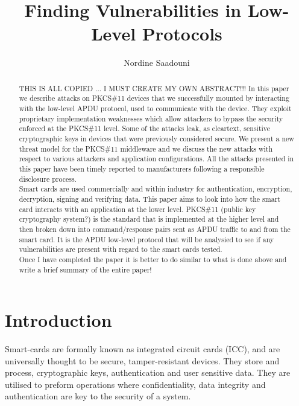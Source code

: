 \documentclass[a4paper]{report}
\begin{document}
\title{Finding Vulnerabilities in Low-Level Protocols}
\date{}
\author{Nordine Saadouni}
\maketitle
\newpage



\begin{abstract}

THIS IS ALL COPIED ... I MUST CREATE MY OWN ABSTRACT!!!
\noindent In this paper we describe attacks on PKCS\#11 devices that we successfully mounted by interacting with
the low-level APDU protocol, used to communicate with the device. They exploit proprietary implementation
weaknesses which allow attackers to bypass the security enforced at the PKCS\#11 level. Some of the attacks
leak, as cleartext, sensitive cryptographic keys in devices that were previously considered secure. We
present a new threat model for the PKCS\#11 middleware and we discuss the new attacks with respect to
various attackers and application configurations. All the attacks presented in this paper have been timely
reported to manufacturers following a responsible disclosure process.\\


Smart cards are used commercially and within industry for authentication, encryption, decryption, signing and verifying data. This paper aims to look into how the smart card interacts with an application at the lower level. PKCS\#11 (public key cryptography system?) is the standard that is implemented at the higher level and then broken down into command/response pairs sent as APDU traffic to and from the smart card. It is the APDU low-level protocol that will be analysied to see if any vulnerabilities are present with regard to the smart cards tested.\\


Once I have completed the paper it is better to do similar to what is done above and write a brief summary of the entire paper!


\end{abstract}
\newpage


\tableofcontents
\newpage


\chapter{Introduction}
Smart-cards are formally known as integrated circuit cards (ICC), and are universally thought to be secure, tamper-resistant devices. They store and process, cryptographic keys, authentication and user sensitive data. They are utilised to preform operations where confidentiality, data integrity and authentication are key to the security of a system.\\
\end{document}
